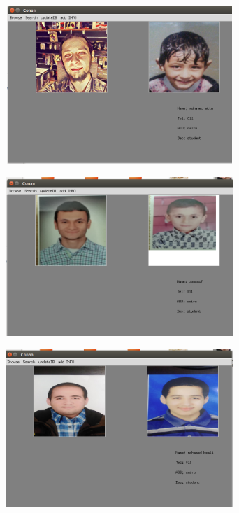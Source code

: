 \documentclass[pdftex,10pt,a4paper,oneside]{article}
\begin{document}
	
	\begin{figure}[H]
	\centering
	\includegraphics[width=120mm,height=60mm]{fig/18.png}
\end{figure}
	\begin{figure}[H]
	\centering
	\includegraphics[width=120mm,height=60mm]{fig/14.png}
\end{figure}
			\begin{figure}[H]
			\centering
			\includegraphics[width=120mm,height=60mm]{fig/15.png}
		\end{figure}
\end{document}
